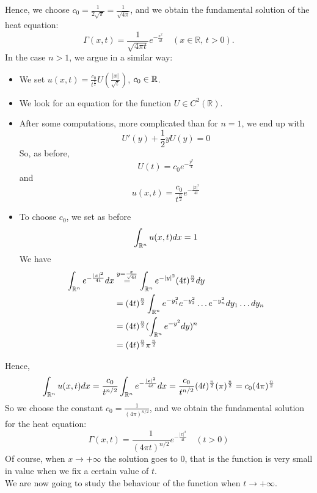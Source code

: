 Hence, we choose \( c_0= \frac{1}{2 \sqrt{\pi}}= \frac{1}{\sqrt{4 \pi }} \), and we obtain the fundamental solution of the heat equation:
\[
\Gamma(x,t) = \frac{1}{\sqrt{4\pi t}} e^{-\frac{x^2}{4t}} \quad (x \in \mathbb{R}, \, t > 0).
\]
In the case \( n>1 \), we argue in a similar way:
\begin{itemize}
    \item We set \( u(x,t) = \frac{c_0}{t^{\frac{n}{2}}} U(\frac{|x|}{\sqrt{t}}) \), $c_0 \in \mathbb{R}$.
    \item We look for an equation for the function \( U \in C^2(\mathbb{R}) \).
    \item After some computations,  more complicated than for \( n = 1 \), we end up with
\[
U'(y) + \frac{1}{2} y U(y) = 0
\]
So, as before,
\[
U(t) = c_0 e^{-\frac{y^2}{4}}
\]
and 
\[
u(x,t) = \frac{c_0}{t^\frac{n}{2}} e^{-\frac{|x|^2}{4t}} 
\]
\item To choose $c_0$, we set as before 
\begin{equation*}
    \int_{\mathbb{R}^n} u(x,t) dx = 1
\end{equation*}
We have 
\begin{align*}
    \int_{\mathbb{R}^n} e^{-\frac{|x|^2}{4t}} dx &\stackrel{y = \frac{x}{\sqrt{4t}}}= \int_{\mathbb{R}^n} e^{-|y|^2}(4t) ^ \frac{n}{2}dy \\
    &= (4t)^\frac{n}{2} \int_{\mathbb{R}^n}e^{- y_1^2} e^{-y_2^2} \ldots e^{-y_n^2} dy_1 \ldots dy_n \\
    &= (4t)^\frac{n}{2} (\int_{\mathbb{R}^n} e^{-y^2}dy)^n \\
    &= (4t)^\frac{n}{2} \pi^\frac{n}{2}
\end{align*}
\end{itemize}
Hence, 
\[
 \int_{\mathbb{R}^n} u(x,t) dx= \frac{c_0}{t^{n/2}} \int_{\mathbb{R}^n} e^{-\frac{|x|^2}{4t}} dx=  \frac{c_0}{t^{n/2}}(4t)^{\frac{n}{2}}(\pi)^{\frac{n}{2}} = c_0 (4\pi)^{\frac{n}{2}}
\]
So we choose the constant \( c_0 = \frac{1}{(4\pi )^{n/2}} \), and we obtain the fundamental solution for the heat equation:
\[
\Gamma(x,t) = \frac{1}{(4\pi t)^{n/2}} e^{-\frac{|x|^2}{4t}} \quad (t > 0)
\]
Of course, when $x \rightarrow +\infty$ the solution goes to $0$, that is the function is very small in value when we fix a certain value of $t$. \\
We are now going to study the behaviour of the function when $t \rightarrow + \infty$. \\

